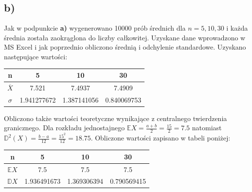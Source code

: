 \documentclass{article}
\begin{document}
\begin{figure}[h!]
\begin{center}
\end{center}
\end{figure}

\subsection*{b)}
Jak w podpunkcie \textbf{a)} wygenerowano 10000 prób średnich dla $n = 5,10,30$ i każda średnia została zaokrąglona do liczby całkowitej. Uzyskane dane wprowadzono w MS Excel i jak poprzednio obliczono średnią i odchylenie standardowe. Uzyskano następujące wartości: \\
\begin{center}
\begin{tabular}{|c|c|c|c|}
\hline
n & 5 & 10 & 30 \\
\hline
$\overline{X}$ & 7.521 & 7.4937 & 7.4909 \\
\hline
$\sigma$ & 1.941277672 & 1.387141056 &  0.840069753 \\
\hline
\end{tabular}
\end{center}

Obliczono także wartości teoretyczne wynikające z centralnego twierdzenia granicznego. Dla rozkładu jednostajnego $\mathbb{E}X = \frac{a+b}{2} = \frac{15}{2} = 7.5$ natomiast $\mathbb{D}^2(X) = \frac{b-a}{12} = \frac{15^2}{12} = 18.75$. Obliczone wartości zapisano w tabeli poniżej: \\
\begin{center}
\begin{tabular}{|c|c|c|c|}
\hline
n & 5 & 10 & 30 \\
\hline
$\mathbb{E}X$ & 7.5 & 7.5 & 7.5 \\
\hline
$\mathbb{D}X$ & 1.936491673 & 1.369306394 &  0.790569415 \\
\hline
\end{tabular}
\end{center}
\end{document}
